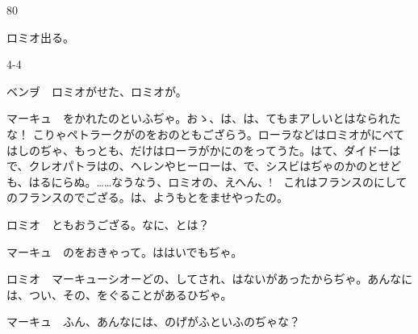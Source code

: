 \documentclass[tate,paper=b6j,jafontsize=9pt]{jlreq}
\begin{document}
\begin{azconvIndented}{8\zw}{0\zw}

ロミオ出る。

\end{azconvIndented}
\begin{azconvIndented}{4\zw}{-4\zw}

ベンヺ　ロミオがせた、ロミオが。

マーキュ　をかれたのといふぢゃ。おゝ、は、は、てもまアしいとはなられたな！ こりゃペトラークがのをおのともござらう。ローラなどはロミオがにべてはしのぢゃ、もっとも、だけはローラがかにのをってうた。はて、ダイドーはで、クレオパトラはの、ヘレンやヒーローは、で、シスビはぢゃのかのとせども、はるにらぬ。……なうなう、ロミオの、えへん、!　これはフランスのにしてのフランスのでござる。は、ようもとをませやったの。

ロミオ　ともおうござる。なに、とは？

マーキュ　のをおきゃって。ははいでもぢゃ。

ロミオ　マーキューシオーどの、してされ、はないがあったからぢゃ。あんなには、つい、その、をぐることがあるひぢゃ。

マーキュ　ふん、あんなには、のげがふといふのぢゃな？


\end{azconvIndented}
\end{document}
